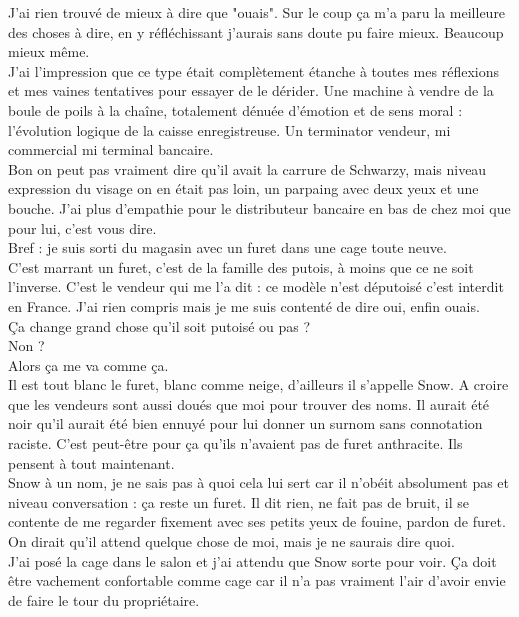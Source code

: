 J'ai rien trouvé de mieux à dire que "ouais". Sur le coup ça m'a paru la meilleure des choses à dire, en y réfléchissant j'aurais sans doute pu faire mieux. Beaucoup mieux même.\\
J'ai l'impression que ce type était complètement étanche à toutes mes réflexions et mes vaines tentatives pour essayer de le dérider. Une machine à vendre de la boule de poils à la chaîne, totalement dénuée d'émotion et de sens moral : l'évolution logique de la caisse enregistreuse. Un terminator vendeur, mi commercial mi terminal bancaire.\\
Bon on peut pas vraiment dire qu'il avait la carrure de Schwarzy, mais niveau expression du visage on en était pas loin, un parpaing avec deux yeux et une bouche. J'ai plus d'empathie pour le distributeur bancaire en bas de chez moi que pour lui, c'est vous dire. \\
Bref : je suis sorti du magasin avec un furet dans une cage toute neuve. \\

C'est marrant un furet, c'est de la famille des putois, à moins que ce ne soit l'inverse. C'est le vendeur qui me l'a dit : ce modèle n'est députoisé c'est interdit en France. J'ai rien compris mais je me suis contenté de dire oui, enfin ouais.\\
Ça change grand chose qu'il soit putoisé ou pas ? \\
Non ? \\
Alors ça me va comme ça. \\

Il est tout blanc le furet, blanc comme neige, d'ailleurs il s'appelle Snow. A croire que les vendeurs sont aussi doués que moi pour trouver des noms. Il aurait été noir qu'il aurait été bien ennuyé pour lui donner un surnom sans connotation raciste. C'est peut-être pour ça qu'ils n'avaient pas de furet anthracite. Ils pensent à tout maintenant. \\
Snow à un nom, je ne sais pas à quoi cela lui sert car il n'obéit absolument pas et niveau conversation : ça reste un furet. Il dit rien, ne fait pas de bruit, il se contente de me regarder fixement avec ses petits yeux de fouine, pardon de furet. On dirait qu'il attend quelque chose de moi, mais je ne saurais dire quoi. \\

J'ai posé la cage dans le salon et j'ai attendu que Snow sorte pour voir. Ça doit être vachement confortable comme cage car il n'a pas vraiment l'air d'avoir envie de faire le tour du propriétaire. \\

